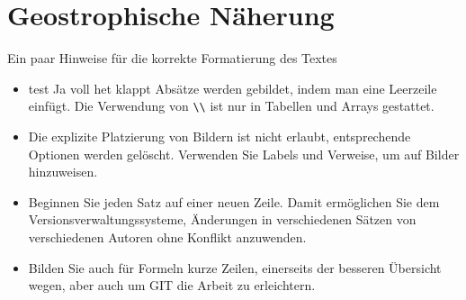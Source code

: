 %
%
%
%
\chapter{Geostrophische Näherung\label{chapter:geostrophisch}}
\begin{refsection}

Ein paar Hinweise für die korrekte Formatierung des Textes
\begin{itemize}
\item
test Ja voll het klappt 
Absätze werden gebildet, indem man eine Leerzeile einfügt.
Die Verwendung von \verb+\\+ ist nur in Tabellen und Arrays gestattet.
\item
Die explizite Platzierung von Bildern ist nicht erlaubt, entsprechende
Optionen werden gelöscht. 
Verwenden Sie Labels und Verweise, um auf Bilder hinzuweisen.
\item
Beginnen Sie jeden Satz auf einer neuen Zeile. 
Damit ermöglichen Sie dem Versionsverwaltungssysteme, Änderungen
in verschiedenen Sätzen von verschiedenen Autoren ohne Konflikt 
anzuwenden.
\item 
Bilden Sie auch für Formeln kurze Zeilen, einerseits der besseren
Übersicht wegen, aber auch um GIT die Arbeit zu erleichtern.
\end{itemize}






\printbibliography[heading=subbibliography]
\end{refsection}
